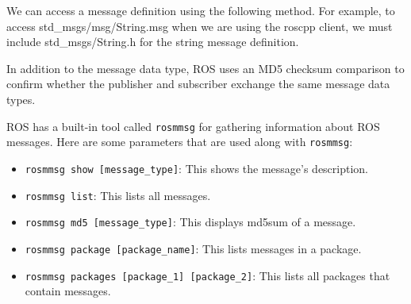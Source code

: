 \documentclass[../../main]{subfiles}
\begin{document}
We can access a message definition using the following method. For example, to access std\_msgs/msg/String.msg when we are using the roscpp client, we must include std\_msgs/String.h for the string message definition.

In addition to the message data type, ROS uses an MD5 checksum comparison to confirm whether the publisher and subscriber exchange the same message data types.

ROS has a built-in tool called \texttt{rosmmsg} for gathering information about ROS messages. Here are some parameters that are used along with \texttt{rosmmsg}:
\begin{itemize}
    \item \texttt{rosmmsg show [message\_type]}: This shows the message's description.
    \item \texttt{rosmmsg list}: This lists all messages.
    \item \texttt{rosmmsg md5 [message\_type]}: This displays md5sum of a message.
    \item \texttt{rosmmsg package [package\_name]}: This lists messages in a package.
    \item \texttt{rosmmsg packages [package\_1] [package\_2]}: This lists all packages that contain messages.
\end{itemize}
\newpage
\end{document}
